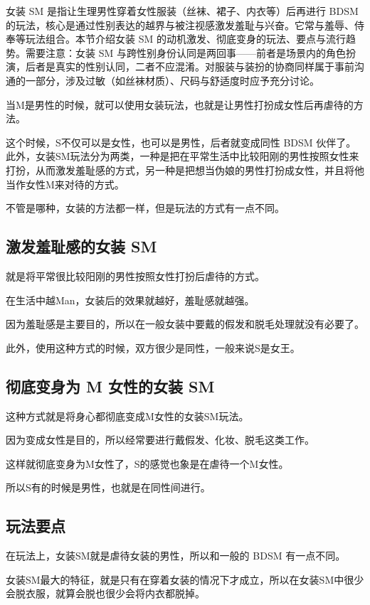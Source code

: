 \documentclass[12pt,UTF8]{ctexbook}
\begin{document}
女装 SM 是指让生理男性穿着女性服装（丝袜、裙子、内衣等）后再进行 BDSM 的玩法，核心是通过性别表达的越界与被注视感激发羞耻与兴奋。它常与羞辱、侍奉等玩法组合。本节介绍女装 SM 的动机激发、彻底变身的玩法、要点与流行趋势。需要注意：女装 SM 与跨性别身份认同是两回事——前者是场景内的角色扮演，后者是真实的性别认同，二者不应混淆。对服装与装扮的协商同样属于事前沟通的一部分，涉及过敏（如丝袜材质）、尺码与舒适度时应予充分讨论。

当M是男性的时候，就可以使用女装玩法，也就是让男性打扮成女性后再虐待的方法。

这个时候，S不仅可以是女性，也可以是男性，后者就变成同性 BDSM 伙伴了。此外，女装SM玩法分为两类，一种是把在平常生活中比较阳刚的男性按照女性来打扮，从而激发羞耻感的方式，另一种是把想当伪娘的男性打扮成女性，并且将他当作女性M来对待的方式。

不管是哪种，女装的方法都一样，但是玩法的方式有一点不同。 

\subsection{激发羞耻感的女装 SM}

就是将平常很比较阳刚的男性按照女性打扮后虐待的方式。

在生活中越Man，女装后的效果就越好，羞耻感就越强。

因为羞耻感是主要目的，所以在一般女装中要戴的假发和脱毛处理就没有必要了。

此外，使用这种方式的时候，双方很少是同性，一般来说S是女王。 

\subsection{彻底变身为 M 女性的女装 SM}

这种方式就是将身心都彻底变成M女性的女装SM玩法。

因为变成女性是目的，所以经常要进行戴假发、化妆、脱毛这类工作。

这样就彻底变身为M女性了，S的感觉也象是在虐待一个M女性。

所以S有的时候是男性，也就是在同性间进行。 

\subsection{玩法要点}

在玩法上，女装SM就是虐待女装的男性，所以和一般的 BDSM 有一点不同。

女装SM最大的特征，就是只有在穿着女装的情况下才成立，所以在女装SM中很少会脱衣服，就算会脱也很少会将内衣都脱掉。
\end{document}
